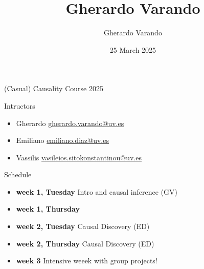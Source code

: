 \documentclass{beamer}
\institute[]{}
\title{Gherardo Varando}
\author{Gherardo Varando}
\date{25 March 2025}
\begin{document}
\begin{frame}{(Casual) Causality Course 2025}

	\begin{block}{Intructors}
	  \begin{itemize}
	    \item Gherardo \url{gherardo.varando@uv.es}
	    \item Emiliano \url{emiliano.diaz@uv.es} 
	    \item Vassilis \url{vasileios.sitokonstantinou@uv.es}
	  \end{itemize}
	\end{block}
	
	\begin{block}{Schedule} 
         \begin{itemize}
	   \item \textbf{week 1, Tuesday} Intro and causal inference (GV)
	   \item \textbf{week 1, Thursday}     
	   \item \textbf{week 2, Tuesday} Causal Discovery (ED)
	   \item \textbf{week 2, Thursday} Causal Discovery (ED)
	   \item \textbf{week 3} Intensive weeek with group projects! 
	 \end{itemize}
	\end{block}


\end{frame}
\end{document}
